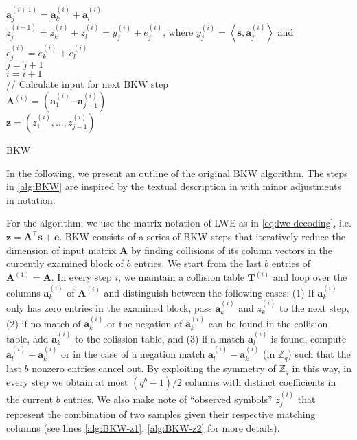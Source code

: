 \begin{algorithm2e}
{{{{{          $\mathbf{a}_j^{(i+1)} = \mathbf{a}_k^{(i)} + \mathbf{a}_l^{(i)}$\\
          $z_j^{(i+1)} = z_k^{(i)} + z_l^{(i)} = y_j^{(i)} + e_j^{(i)}$, where $y_j^{(i)} = \left\langle \mathbf{s}, \mathbf{a}_j^{(i)}\right\rangle$ and $e_j^{(i)} = e_k^{(i)} + e_l^{(i)}$\label{alg:BKW-z2}\\
          $j = j + 1$\\
        } %
      }
    }
    $i = i + 1$\\
    // Calculate input for next BKW step\\
    $\mathbf{A}^{(i)} = (\mathbf{a}_1^{(i)} \cdots \mathbf{a}_{j-1}^{(i)})$\\
    $\mathbf{z} = (z_1^{(i)}, \ldots, z_{j-1}^{(i)})$\\
  }
}
\caption{BKW}\label{alg:BKW}
\end{algorithm2e} %

In the following, we present an outline of the original BKW algorithm. The steps in \cref{alg:BKW} are inspired by the textual description in \cite{GJS15} with minor adjustments in notation. 

For the algorithm, we use the matrix notation of LWE as in \cref{eq:lwe-decoding}, i.e. $\mathbf{z} = \mathbf{A}^\intercal \mathbf{s} + \mathbf{e}$. BKW consists of a series of BKW steps that iteratively reduce the dimension of input matrix $\mathbf{A}$ by finding collisions of its column vectors in the currently examined block of $b$ entries. We start from the last $b$ entries of $\mathbf{A}^{(1)} = \mathbf{A}$. In every step $i$, we maintain a collision table $\mathbf{T}^{(i)}$ and loop over the columns $\mathbf{a}_k^{(i)}$ of $\mathbf{A}^{(i)}$ and distinguish between the following cases: (1) If $\mathbf{a}_k^{(i)}$ only has zero entries in the examined block, pass $\mathbf{a}_k^{(i)}$ and $z_k^{(i)}$ to the next step, (2) if no match of $\mathbf{a}_k^{(i)}$ or the negation of $\mathbf{a}_k^{(i)}$ can be found in the collision table, add $\mathbf{a}_k^{(i)}$ to the colission table, and (3) if a match $\mathbf{a}_l^{(i)}$ is found, compute $\mathbf{a}_l^{(i)} + \mathbf{a}_k^{(i)}$ or in the case of a negation match $\mathbf{a}_l^{(i)} - \mathbf{a}_k^{(i)}$ (in $\mathbb{Z}_q$) such that the last $b$ nonzero entries cancel out. By exploiting the symmetry of $\mathbb{Z}_q$ in this way, in every step we obtain at most $(q^b - 1)/2$ columns with distinct coefficients in the current $b$ entries. We also make note of ``observed symbols'' $z_j^{(i)}$ that represent the combination of two samples given their respective matching columns (see lines \ref{alg:BKW-z1}, \ref{alg:BKW-z2} for more details).

